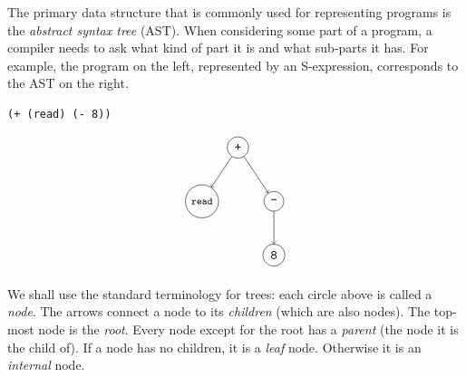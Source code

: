 \documentclass[11pt]{book}
\begin{document}
The primary data structure that is commonly used for representing
programs is the \emph{abstract syntax tree} (AST). When considering
some part of a program, a compiler needs to ask what kind of part it
is and what sub-parts it has. For example, the program on the left,
represented by an S-expression, corresponds to the AST on the right.
\begin{center}
\begin{minipage}{0.4\textwidth}
\begin{lstlisting}
(+ (read) (- 8))
\end{lstlisting}
\end{minipage}
\begin{minipage}{0.4\textwidth}
\begin{equation}
\begin{tikzpicture}
 \node[draw, circle] (plus)  at (0 ,  0) {\key{+}};
 \node[draw, circle] (read)  at (-1, -1.5) {{\footnotesize\key{read}}};
 \node[draw, circle] (minus) at (1 , -1.5) {$\key{-}$};
 \node[draw, circle] (8)     at (1 , -3) {\key{8}};

 \draw[->] (plus) to (read);
 \draw[->] (plus) to (minus);
 \draw[->] (minus) to (8);
\end{tikzpicture}
\label{eq:arith-prog}
\end{equation}
\end{minipage}
\end{center}
We shall use the standard terminology for trees: each circle above is
called a \emph{node}. The arrows connect a node to its \emph{children}
(which are also nodes). The top-most node is the \emph{root}.  Every
node except for the root has a \emph{parent} (the node it is the child
of). If a node has no children, it is a \emph{leaf} node.  Otherwise
it is an \emph{internal} node.
\end{document}
